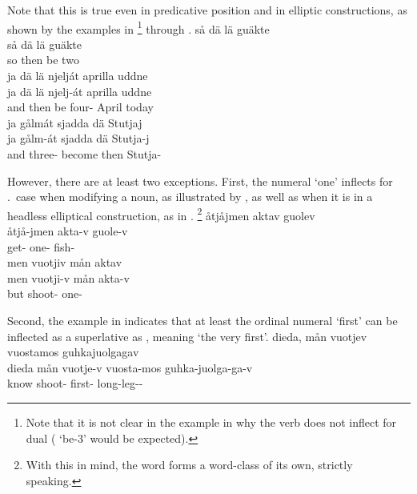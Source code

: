 Note that this is true even in predicative position and in elliptic constructions, as shown by the examples in \footnote{Note that it is not clear in the example in  why the verb does not inflect for dual ( ‘be-3’ would be expected).} 
through .
\ea\label{numeralEx3}%
\glll	så dä lä guäkte\\
	så dä lä guäkte\\
	so then be\BS{} two\\\nopagebreak
{}	
\z
\ea\label{numeralEx2}%
\glll	ja dä lä njelját aprilla uddne\\
	ja dä lä njelj-át aprilla uddne\\
	and then be\BS{} four- April today\\\nopagebreak
{}	
\z
\ea\label{numeralEx4}%
\glll	ja gålmát sjadda dä Stutjaj\\
	ja gålm-át sjadda dä Stutja-j\\
	and three- become\BS{} then Stutja-\\\nopagebreak
{}	
\z

However, there are at least two exceptions. First, the numeral  ‘one’ inflects for \ACCs.\SGs\ case when modifying a noun, as illustrated by , as well as when it is in a headless elliptical construction, as in .%
\footnote{With this in mind, the word  forms a word-class of its own, strictly speaking.}
\ea\label{numOneEx1}
\glll	åtjåjmen aktav guolev\\
	åtjå-jmen akta-v guole-v\\
	get- one- fish-\\\nopagebreak
{}	
\z
\ea\label{numOneEx2}
\glll	men vuotjiv mån aktav\\
	men vuotji-v mån akta-v\\
	but shoot-  one-\\\nopagebreak
{}	
\z

Second, the example in  indicates that at least the ordinal numeral  ‘first’ can be inflected as a superlative as , meaning ‘the very first’. 
\ea\label{veryFirstEx}%
\glll	dieda, mån vuotjev vuostamos guhkajuolgagav\\
	dieda mån vuotje-v vuosta-mos guhka-juolga-ga-v\\
	know\BS{}  shoot- first- long-leg--\\\nopagebreak
{}	
\z





%
